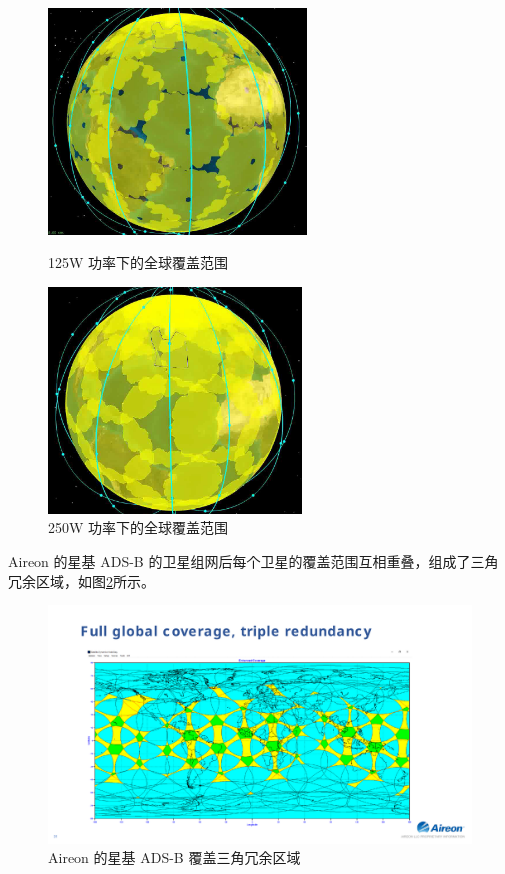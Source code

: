 \begin{figure}[!htb]
\centering
\begin{minipage}[t]{0.48\textwidth}
\centering
\includegraphics[height=6cm]{pic/CPWG16_PPT09_Satellite_Based_ADSB_December2013.png}
\caption{125W 功率下的全球覆盖范围\protect\footnotemark}
\label{fig:CPWG16_PPT09_Satellite_Based_ADSB_December2013}
\end{minipage}
\begin{minipage}[t]{0.48\textwidth}
\centering
\includegraphics[height=6cm]{pic/CPWG16_PPT09_Satellite_Based_ADSB_December2013_1.png
}
\caption{250W 功率下的全球覆盖范围\protect\footnotemark}
\label{fig:CPWG16_PPT09_Satellite_Based_ADSB_December2013_1}
\end{minipage}
\end{figure}

Aireon 的星基 ADS-B 的卫星组网后每个卫星的覆盖范围互相重叠，组成了三角冗余区域，如图\ref{fig:Aireon-NAM-CAR-SAM-ADS-B-WS-v4-31}所示。

\begin{figure}[!htb]
\centering
\includegraphics[width=14.5cm]{pic/Aireon-NAM-CAR-SAM-ADS-B-WS-v4-31.pdf}
\caption{Aireon 的星基 ADS-B 覆盖三角冗余区域\protect\footnotemark}
\label{fig:Aireon-NAM-CAR-SAM-ADS-B-WS-v4-31}
\end{figure}

